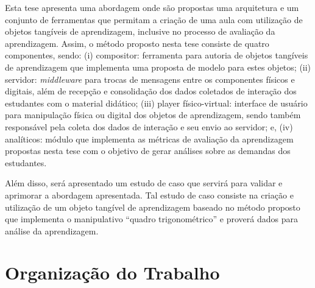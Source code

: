 Esta tese apresenta uma abordagem
onde são propostas uma arquitetura e um conjunto de ferramentas que permitam a criação de uma aula com utilização de objetos tangíveis de aprendizagem, inclusive no processo de avaliação da aprendizagem. Assim, o método proposto nesta tese consiste de quatro componentes, sendo: (i) compositor: ferramenta para autoria de objetos tangíveis de aprendizagem que implementa uma proposta de modelo para estes objetos; (ii) servidor: \textit{middleware} para trocas de mensagens entre os componentes físicos e digitais, além de recepção e consolidação dos dados coletados de interação dos estudantes com o material didático; (iii) player físico-virtual: interface de usuário para manipulação física ou digital dos objetos de aprendizagem, sendo também responsável pela coleta dos dados de interação e seu envio ao servidor; e, (iv) analíticos: módulo que implementa as métricas de avaliação da aprendizagem propostas nesta tese com o objetivo de gerar análises sobre as demandas dos estudantes.

Além disso, será apresentado um estudo de caso que servirá para validar e aprimorar a abordagem apresentada. Tal estudo de caso consiste na criação e utilização de um objeto tangível de aprendizagem baseado no método proposto que implementa o manipulativo ``quadro trigonométrico'' e proverá dados para análise da aprendizagem.

\section{Organização do Trabalho}
\label{section:outline}

